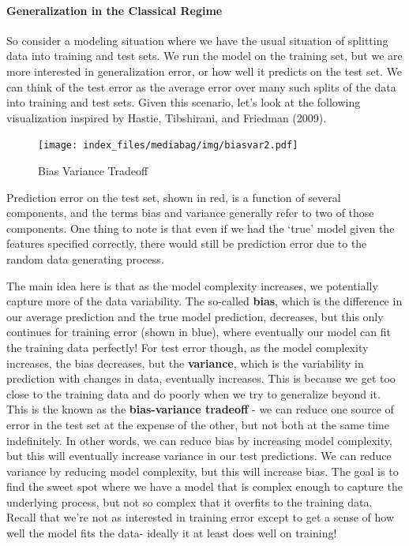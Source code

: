 \documentclass[
  letterpaper,
]{krantz}
\let\oldparagraph\paragraph
\renewcommand{\paragraph}[1]{\oldparagraph{#1}\mbox{}}
\begin{document}
\paragraph{Generalization in the Classical
Regime}\label{generalization-in-the-classical-regime}

So consider a modeling situation where we have the usual situation of
splitting data into training and test sets. We run the model on the
training set, but we are more interested in generalization error, or how
well it predicts on the test set. We can think of the test error as the
average error over many such splits of the data into training and test
sets. Given this scenario, let's look at the following visualization
inspired by Hastie, Tibshirani, and Friedman (2009).

\begin{figure}

{\centering \texttt{[image: index\_files/mediabag/img/biasvar2.pdf]}

}

\caption{\label{fig-bias-variance}Bias Variance Tradeoff}

\end{figure}

Prediction error on the test set, shown in red, is a function of several
components, and the terms bias and variance generally refer to two of
those components. One thing to note is that even if we had the `true'
model given the features specified correctly, there would still be
prediction error due to the random data generating process.

The main idea here is that as the model complexity increases, we
potentially capture more of the data variability. The so-called
\textbf{bias}, which is the difference in our average prediction and the
true model prediction, decreases, but this only continues for training
error (shown in blue), where eventually our model can fit the training
data perfectly! For test error though, as the model complexity
increases, the bias decreases, but the \textbf{variance}, which is the
variability in prediction with changes in data, eventually increases.
This is because we get too close to the training data and do poorly when
we try to generalize beyond it. This is the known as the
\textbf{bias-variance tradeoff} - we can reduce one source of error in
the test set at the expense of the other, but not both at the same time
indefinitely. In other words, we can reduce bias by increasing model
complexity, but this will eventually increase variance in our test
predictions. We can reduce variance by reducing model complexity, but
this will increase bias. The goal is to find the sweet spot where we
have a model that is complex enough to capture the underlying process,
but not so complex that it overfits to the training data. Recall that
we're not as interested in training error except to get a sense of how
well the model fits the data- ideally it at least does well on training!
\end{document}
